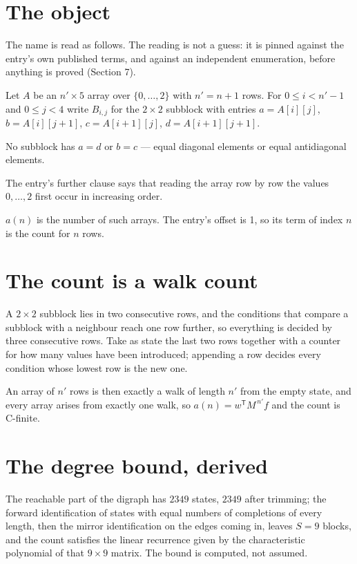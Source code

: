 \documentclass[11pt]{article}
\theoremstyle{definition}
\begin{document}
\section{The object}

The name is read as follows. The reading is not a guess: it is pinned against the entry's own published terms, and against an independent enumeration, before anything is proved (Section 7).

Let $A$ be an $n' \times 5$ array over $\{0,\dots,2\}$ with $n' = n + 1$ rows. For $0 \le i < n'-1$ and $0 \le j < 4$ write $B_{i,j}$ for the $2\times2$ subblock with entries $a = A[i][j]$, $b = A[i][j{+}1]$, $c = A[i{+}1][j]$, $d = A[i{+}1][j{+}1]$.

No subblock has $a = d$ or $b = c$ --- equal diagonal elements or equal antidiagonal elements.

The entry's further clause says that reading the array row by row the values $0,\dots,2$ first occur in increasing order.

$a(n)$ is the number of such arrays. The entry's offset is 1, so its term of index $n$ is the count for $n$ rows.

\section{The count is a walk count}

A $2\times2$ subblock lies in two consecutive rows, and the conditions that compare a subblock with a neighbour reach one row further, so everything is decided by three consecutive rows. Take as state the last two rows together with a counter for how many values have been introduced; appending a row decides every condition whose lowest row is the new one.

An array of $n'$ rows is then exactly a walk of length $n'$ from the empty state, and every array arises from exactly one walk, so $a(n) = w^{\mathsf T}M^{\,n'}f$ and the count is C-finite.

\section{The degree bound, derived}

The reachable part of the digraph has $2349$ states, $2349$ after trimming; the forward identification of states with equal numbers of completions of every length, then the mirror identification on the edges coming in, leaves $S = 9$ blocks, and the count satisfies the linear recurrence given by the characteristic polynomial of that $9\times9$ matrix. The bound is computed, not assumed.
\end{document}
